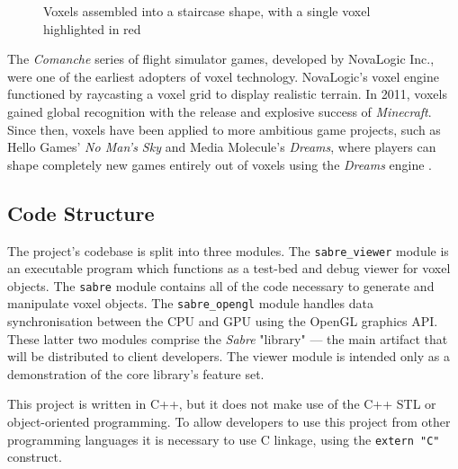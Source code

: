 \begin{figure}[h]
    \centering
    
    \caption{Voxels assembled into a staircase shape, with a single voxel highlighted in red \autocite{wiki:voxels_svg}}
    \label{fig:voxels_demo}
\end{figure}

The \textit{Comanche} series of flight simulator games, developed by NovaLogic Inc., were one of the earliest adopters of voxel technology. NovaLogic's voxel engine functioned by raycasting a voxel grid to display realistic terrain. In 2011, voxels gained global recognition with the release and explosive success of \textit{Minecraft}. Since then, voxels have been applied to more ambitious game projects, such as Hello Games' \textit{No Man's Sky} \autocite{mckendrick2017nomanssky} and Media Molecule's \textit{Dreams}, where players can shape completely new games entirely out of voxels using the \textit{Dreams} engine \autocite{evans2015dreams}.

\subsection{Code Structure}
The project's codebase is split into three modules. The \texttt{sabre\_viewer} module is an executable program which functions as a test-bed and debug viewer for voxel objects. The \texttt{sabre} module contains all of the code necessary to generate and manipulate voxel objects. The \texttt{sabre\_opengl} module handles data synchronisation between the CPU and GPU using the OpenGL graphics API. These latter two modules comprise the \textit{Sabre} "library" --- the main artifact that will be distributed to client developers. The viewer module is intended only as a demonstration of the core library's feature set.

This project is written in C++, but it does not make use of the C++ STL or object-oriented programming. To allow developers to use this project from other programming languages it is necessary to use C linkage, using the \texttt{extern "C"} construct. 

